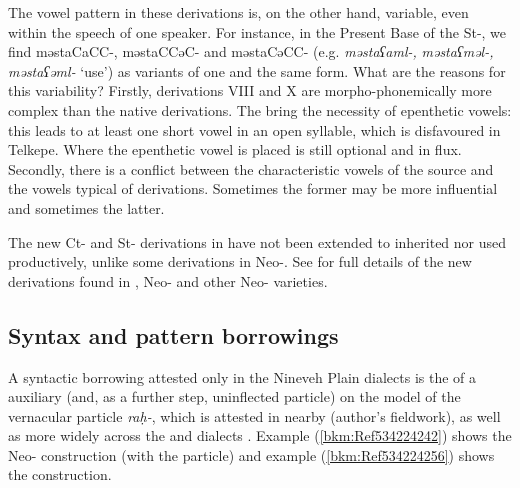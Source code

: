 \documentclass[output=paper]{langsci/langscibook}
\begin{document}
The vowel pattern in these derivations is, on the other hand, variable, even within the speech of one speaker. For instance, in the Present Base of the St-, we find məstaCaCC-, məstaCCəC- and məstaCəCC- (e.g. \textit{məstaʕaml-,} \textit{məstaʕməl-,} \textit{məstaʕəml-} ‘use’) as variants of one and the same form. What are the reasons for this variability? Firstly,  derivations VIII and X are morpho-phonemically more complex than the native  derivations. The  bring the necessity of epenthetic vowels: this leads to at least one short vowel in an open syllable, which is disfavoured in Telkepe. Where the epenthetic vowel is placed is still optional and in flux. Secondly, there is a conflict between the characteristic vowels of the   source and the vowels typical of  derivations. Sometimes the former may be more influential and sometimes the latter.

The new Ct- and St- derivations in  have not been extended to inherited  nor used productively, unlike some  derivations in  Neo-. See \citet{Coghill2015} for full details of the new derivations found in ,  Neo- and other Neo- varieties.

\subsection{\label{bkm:Ref534214095}Syntax and pattern borrowings}

A syntactic borrowing attested only in the  Nineveh Plain dialects is the  of a  auxiliary (and, as a further step, uninflected particle) on the model of the vernacular    particle \textit{raḥ-}, which is attested in nearby   (author’s fieldwork), as well as more widely across the  and   dialects \citep[304]{Jastrow1978}. Example (\ref{bkm:Ref534224242}) shows the Neo- construction (with the particle) and example (\ref{bkm:Ref534224256}) shows the  construction.

\end{document}

